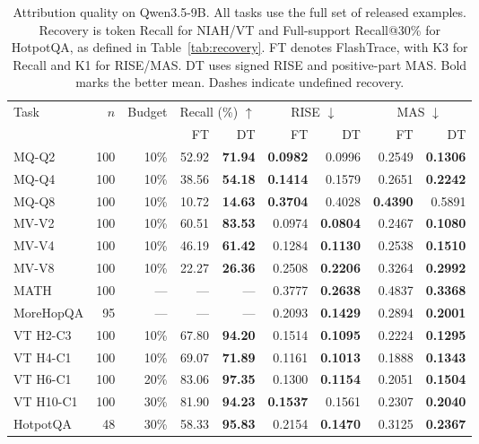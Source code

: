 \begin{table}[t]
\centering\small
\caption{Attribution quality on Qwen3.5-9B. All tasks use the full set of released examples. Recovery is token Recall for NIAH/VT and Full-support Recall@30\% for HotpotQA, as defined in Table~\ref{tab:recovery}. FT denotes FlashTrace, with K3 for Recall and K1 for RISE/MAS. DT uses signed RISE and positive-part MAS. Bold marks the better mean. Dashes indicate undefined recovery.}
\label{tab:qwen35-quality}
\setlength{\tabcolsep}{4.0pt}
\begin{tabular}{@{}lrr rr rr rr@{}}
\toprule
Task & $n$ & Budget & \multicolumn{2}{c}{Recall (\%) $\uparrow$} & \multicolumn{2}{c}{RISE $\downarrow$} & \multicolumn{2}{c}{MAS $\downarrow$} \\
\cmidrule(lr){4-5}\cmidrule(lr){6-7}\cmidrule(l){8-9}
 & & & FT & DT & FT & DT & FT & DT \\
\midrule
MQ-Q2 & 100 & 10\% & 52.92 & \textbf{71.94} & \textbf{0.0982} & 0.0996 & 0.2549 & \textbf{0.1306} \\
MQ-Q4 & 100 & 10\% & 38.56 & \textbf{54.18} & \textbf{0.1414} & 0.1579 & 0.2651 & \textbf{0.2242} \\
MQ-Q8 & 100 & 10\% & 10.72 & \textbf{14.63} & \textbf{0.3704} & 0.4028 & \textbf{0.4390} & 0.5891 \\
MV-V2 & 100 & 10\% & 60.51 & \textbf{83.53} & 0.0974 & \textbf{0.0804} & 0.2467 & \textbf{0.1080} \\
MV-V4 & 100 & 10\% & 46.19 & \textbf{61.42} & 0.1284 & \textbf{0.1130} & 0.2538 & \textbf{0.1510} \\
MV-V8 & 100 & 10\% & 22.27 & \textbf{26.36} & 0.2508 & \textbf{0.2206} & 0.3264 & \textbf{0.2992} \\
\midrule
MATH & 100 & --- & --- & --- & 0.3777 & \textbf{0.2638} & 0.4837 & \textbf{0.3368} \\
MoreHopQA & 95 & --- & --- & --- & 0.2093 & \textbf{0.1429} & 0.2894 & \textbf{0.2001} \\
\midrule
VT H2-C3 & 100 & 10\% & 67.80 & \textbf{94.20} & 0.1514 & \textbf{0.1095} & 0.2224 & \textbf{0.1295} \\
VT H4-C1 & 100 & 10\% & 69.07 & \textbf{71.89} & 0.1161 & \textbf{0.1013} & 0.1888 & \textbf{0.1343} \\
VT H6-C1 & 100 & 20\% & 83.06 & \textbf{97.35} & 0.1300 & \textbf{0.1154} & 0.2051 & \textbf{0.1504} \\
VT H10-C1 & 100 & 30\% & 81.90 & \textbf{94.23} & \textbf{0.1537} & 0.1561 & 0.2307 & \textbf{0.2040} \\
HotpotQA & 48 & 30\% & 58.33 & \textbf{95.83} & 0.2154 & \textbf{0.1470} & 0.3125 & \textbf{0.2367} \\
\bottomrule
\end{tabular}
\end{table}
